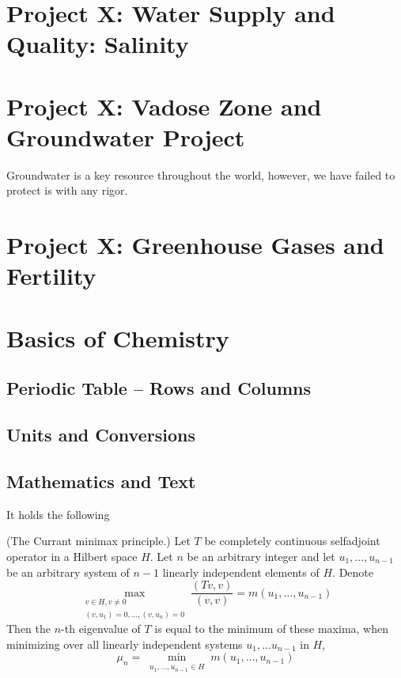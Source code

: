 \documentclass{tufte-book}\usepackage[]{graphicx}\usepackage[]{xcolor}
\begin{document}
\chapter{Project X: Water Supply and Quality: Salinity}

\chapter{Project X: Vadose Zone and Groundwater Project}

Groundwater is a key resource throughout the world, however, we have failed to protect is with any rigor.

\chapter{Project X: Greenhouse Gases and Fertility}


\chapter{Basics of Chemistry}

\section{Periodic Table -- Rows and Columns}

\section{Units and Conversions}

\section{Mathematics and Text}

It holds \cite{KarelRektorys} the following
\begin{theorem}
(The Currant minimax principle.) Let $T$ be completely continuous
selfadjoint operator in a Hilbert space $H$. Let $n$ be an
arbitrary integer and let $u_1,\ldots,u_{n-1}$ be an arbitrary
system of $n-1$ linearly independent elements of $H$. Denote
\begin{equation}
\max_{\substack{v\in H, v\neq
0\\(v,u_1)=0,\ldots,(v,u_n)=0}}\frac{(Tv,v)}{(v,v)}=m(u_1,\ldots,
u_{n-1}) \label{eqn10}
\end{equation}
Then the $n$-th eigenvalue of $T$ is equal to the minimum of these
maxima, when minimizing over all linearly independent systems
$u_1,\ldots u_{n-1}$ in $H$,
\begin{equation}
\mu_n = \min_{\substack{u_1,\ldots, u_{n-1}\in H}} m(u_1,\ldots,
u_{n-1}) \label{eqn20}
\end{equation}
\end{theorem}
\end{document}
